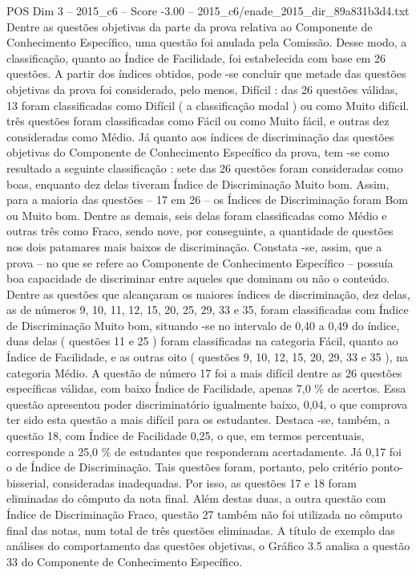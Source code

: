 \begin{textsample}{POS Dim 3 – 2015\_c6 – Score -3.00 – 2015\_c6/enade\_2015\_dir\_89a831b3d4.txt}
Dentre as questões objetivas da parte da prova relativa ao Componente de Conhecimento Específico, uma questão foi anulada pela Comissão.
Desse modo, a classificação, quanto ao Índice de Facilidade, foi estabelecida com base em 26 questões.
A partir dos índices obtidos, pode -se concluir que metade das questões objetivas da prova foi considerado, pelo menos, Difícil : das 26 questões válidas, 13 foram classificadas como Difícil ( a classificação modal ) ou como Muito difícil. três questões foram classificadas como Fácil ou como Muito fácil, e outras dez consideradas como Médio.
Já quanto aos índices de discriminação das questões objetivas do Componente de Conhecimento Específico da prova, tem -se como resultado a seguinte classificação : sete das 26 questões foram consideradas como boas, enquanto dez delas tiveram Índice de Discriminação Muito bom.
Assim, para a maioria das questões – 17 em 26 – os Índices de Discriminação foram Bom ou Muito bom.
Dentre as demais, seis delas foram classificadas como Médio e outras três como Fraco, sendo nove, por conseguinte, a quantidade de questões nos dois patamares mais baixos de discriminação.
Constata -se, assim, que a prova – no que se refere ao Componente de Conhecimento Específico – possuía boa capacidade de discriminar entre aqueles que dominam ou não o conteúdo.
Dentre as questões que alcançaram os maiores índices de discriminação, dez delas, as de números 9, 10, 11, 12, 15, 20, 25, 29, 33 e 35, foram classificadas com Índice de Discriminação Muito bom, situando -se no intervalo de 0,40 a 0,49 do índice, duas delas ( questões 11 e 25 ) foram classificadas na categoria Fácil, quanto ao Índice de Facilidade, e as outras oito ( questões 9, 10, 12, 15, 20, 29, 33 e 35 ), na categoria Médio.
A questão de número 17 foi a mais difícil dentre as 26 questões específicas válidas, com baixo Índice de Facilidade, apenas 7,0 \% de acertos.
Essa questão apresentou poder discriminatório igualmente baixo, 0,04, o que comprova ter sido esta questão a mais difícil para os estudantes.
Destaca -se, também, a questão 18, com Índice de Facilidade 0,25, o que, em termos percentuais, corresponde a 25,0 \% de estudantes que responderam acertadamente.
Já 0,17 foi o de Índice de Discriminação.
Tais questões foram, portanto, pelo critério ponto-bisserial, consideradas inadequadas.
Por isso, as questões 17 e 18 foram eliminadas do cômputo da nota final.
Além destas duas, a outra questão com Índice de Discriminação Fraco, questão 27 também não foi utilizada no cômputo final das notas, num total de três questões eliminadas.
A título de exemplo das análises do comportamento das questões objetivas, o Gráfico 3.5 analisa a questão 33 do Componente de Conhecimento Específico.

\end{textsample}
